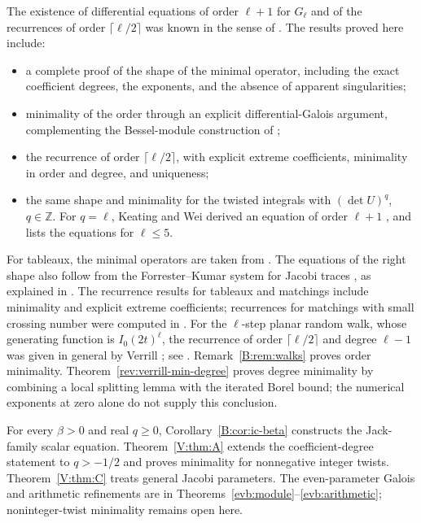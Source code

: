 \documentclass[11pt,a4paper]{article}
\theoremstyle{definition}
\theoremstyle{remark}
\newcommand{\Z}{\mathbb Z}
\newcommand{\cl}[1]{\lceil #1\rceil}
\numberwithin{equation}{section}
\begin{document}
The existence of differential equations of order $\ell+1$ for $G_\ell$ and of the recurrences of order $\cl{\ell/2}$ was known in the sense of \cite{BG00,FW26}. The results proved here include:
\begin{itemize}
\item a complete proof of the shape of the minimal operator, including the exact coefficient degrees, the exponents, and the absence of apparent singularities;
\item minimality of the order through an explicit differential-Galois argument, complementing the Bessel-module construction of \cite[Appendix~B]{FW26};
\item the recurrence of order $\cl{\ell/2}$, with explicit extreme coefficients, minimality in order and degree, and uniqueness;
\item the same shape and minimality for the twisted integrals with $(\det U)^q$, $q\in\Z$. For $q=\ell$, Keating and Wei derived an equation of order $\ell+1$ \cite{KW23}, and \cite[Prop.~4.6]{FW26} lists the equations for $\ell\le5$.
\end{itemize}
For tableaux, the minimal operators are taken from \cite{Kei26}. The equations of the right shape also follow from the Forrester--Kumar system for Jacobi traces \cite{FK22}, as explained in \cite{Kei26}. The recurrence results for tableaux and matchings include minimality and explicit extreme coefficients; recurrences for matchings with small crossing number were computed in \cite{CQRZ08}. For the $\ell$-step planar random walk, whose generating function is $I_0(2t)^\ell$, the recurrence of order $\cl{\ell/2}$ and degree $\ell-1$ was given in general by Verrill \cite{Ver04}; see \cite{BNSW11}. Remark~\ref{B:rem:walks} proves order minimality.
Theorem~\ref{rev:verrill-min-degree} proves degree minimality by combining
a local splitting lemma with the iterated Borel bound; the numerical
exponents at zero alone do not supply this conclusion.

For every $\beta>0$ and real $q\ge0$, Corollary~\ref{B:cor:ic-beta} constructs the Jack-family scalar equation. Theorem~\ref{V:thm:A} extends the coefficient-degree statement to $q>-1/2$ and proves minimality for nonnegative integer twists. Theorem~\ref{V:thm:C} treats general Jacobi parameters. The even-parameter Galois and arithmetic refinements are in Theorems~\ref{evb:module}--\ref{evb:arithmetic}; noninteger-twist minimality remains open here.
\end{document}
